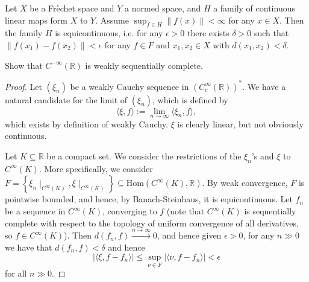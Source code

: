 \documentclass[12pt, reqno,a4paper, twoside]{amsproc}
\renewcommand{\hom}{\mathrm{Hom}}
\newcommand{\dbR}{\mathbb R}
\newcommand{\gen}[1]{\langle{#1}\rangle}
\newcommand{\set}[1]{\left\{{#1}\right\}}
\newcommand{\norm}[1]{\left\|#1\right\|}
\newcommand{\abs}[1]{\left|#1\right|}
\begin{document}
\begin{theo} Let $X$ be a Fr\`echet space and $Y$ a normed space, and $H$ a family of continuous linear maps form $X$ to $Y$. Assume $\sup_{f\in H}\norm{f(x)}<\infty$ for any $x\in X$. Then the family $H$ is equicontinuous, i.e. for any $\epsilon>0$ there exists $\delta>0$ such that $\norm{f(x_1)-f(x_2)}<\epsilon$ for any $f\in F$ and $x_1,x_2\in X$ with $d(x_1,x_2)<\delta$. 
\end{theo}

\begin{exer} Show that $C^{-\infty}(\dbR)$ is weakly sequentially complete.
\end{exer}
\begin{proof}
	Let $(\xi_n)$ be a weakly Cauchy sequence in $(C_c^{\infty}(\dbR))^*$. We have a natural candidate for the limit of $(\xi_n)$, which is defined by
	\[\gen{\xi,f}:=\lim_{n\to\infty}\gen{\xi_n,f},\]
	which exists by definition of weakly Cauchy. $\xi$ is clearly linear, but not obviously continuous.
	
	Let $K\subseteq\dbR$ be a compact set. We consider the restrictions of the $\xi_n$'s and $\xi$ to $C^\infty(K)$. More specifically, we consider $F=\set{\xi_n\mid_{C^\infty(K)},\xi\mid_{C^\infty(K)}}\subseteq\hom(C^\infty(K),\dbR)$. By weak convergence, $F$ is pointwise bounded, and hence, by Banach-Steinhaus, it is equicontinuous. Let $f_n$ be a sequence in $C^\infty(K)$, converging to $f$ (note that $C^\infty(K)$ is sequentially complete with respect to the topology of uniform convergence of all derivatives, so $f\in C^\infty(K)$). Then $d(f_n,f)\xrightarrow{n\to\infty}0$, and hence given $\epsilon>0$, for any $n\gg 0$ we have that $d(f_n,f)<\delta$ and hence \[\abs{\gen{\xi,f-f_n}}\le \sup_{\nu\in F}\abs{\gen{\nu,f-f_n}}<\epsilon\]
 	for all $n\gg 0$.
 \end{proof}
\end{document}
